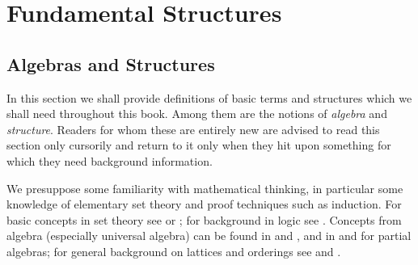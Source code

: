 \chapter{Fundamental Structures}
\thispagestyle{empty}
\label{kap1}
\section{Algebras and Structures}
\label{kap1-1}
%
%
%
In this section we shall provide definitions of basic terms
and structures which we shall need throughout this book.
Among them are the notions of {\it algebra\/} and {\it structure}.
Readers for whom these are entirely new are advised
to read this section only cursorily and return to it only when
they hit upon something for which they need background
information.

We presuppose some familiarity with mathematical thinking,
in particular some knowledge of elementary set theory
and proof techniques such as induction. For basic concepts
in set theory see \cite{vaught:set} or
\cite{justweese:set1,justweese:set2}; for background
in logic see \cite{goldsternjudah}.
Concepts from algebra (especially universal algebra) can
be found in \cite{burris} and \cite{graetzer:algebra}, and in 
\cite{burmeister:partial} and \cite{burmeister:lecturenotes} 
for partial algebras; for general background on
lattices and orderings see \cite{graetzer:lattice}
and \cite{davey}.

